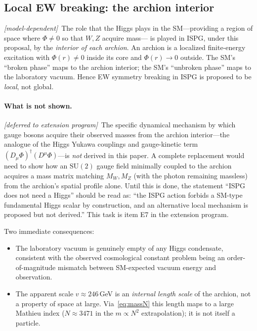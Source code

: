 \documentclass[11pt]{article}
\newcommand{\deferred}{\textit{[deferred to extension program]}}
\newcommand{\modeldep}{\textit{[model-dependent]}}
\begin{document}
\subsection{Local EW breaking: the archion interior}

\modeldep\ The role that the Higgs plays in the SM---providing
a region of space where $\Phi\neq 0$ so that $W,Z$ acquire mass---
is played in ISPG, under this proposal, by the \emph{interior of
each archion}. An archion is a localized finite-energy excitation
with $\Phi(r)\neq 0$ inside its core and $\Phi(r)\to 0$ outside.
The SM's ``broken phase'' maps to the archion interior; the SM's
``unbroken phase'' maps to the laboratory vacuum. Hence EW
symmetry breaking in ISPG is proposed to be \emph{local}, not
global.

\paragraph{What is not shown.} \deferred\ The specific dynamical
mechanism by which gauge bosons acquire their observed masses
from the archion interior---the analogue of the Higgs Yukawa
couplings and gauge-kinetic term
$(D_\mu\Phi)^\dagger(D^\mu\Phi)$---is \emph{not} derived in
this paper. A complete replacement would need to show how an
$\mathrm{SU}(2)$ gauge field minimally coupled to the archion
acquires a mass matrix matching $M_W,M_Z$ (with the photon
remaining massless) from the archion's spatial profile alone.
Until this is done, the statement ``ISPG does not need a Higgs''
should be read as: ``the ISPG action forbids a SM-type
fundamental Higgs scalar by construction, and an alternative
local mechanism is proposed but not derived.'' This task is
item E7 in the extension program.

Two immediate consequences:
\begin{itemize}
  \item[(i)] The laboratory vacuum is genuinely empty of any
  Higgs condensate, consistent with the observed cosmological
  constant problem being an order-of-magnitude mismatch between
  SM-expected vacuum energy and observation.
  \item[(ii)] The apparent scale $v\approx 246$\,GeV is an
  \emph{internal length scale} of the archion, not a property of
  space at large. Via~\eqref{eq:massN} this length maps to a
  large Mathieu index ($N\approx 3471$ in the $m\propto N^2$
  extrapolation); it is not itself a particle.
\end{itemize}
\end{document}
